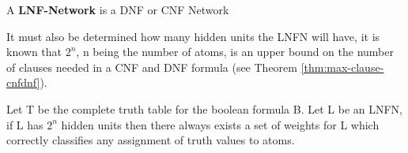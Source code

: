 \theoremstyle{definition}
\begin{definition} \label{def:lnfn}
A \textbf{LNF-Network} is a DNF or CNF Network
\end{definition}

It must also be determined how many hidden units the LNFN will have, it is known that $2^n$, n being the number of atoms, is an upper bound on the number of clauses needed in a CNF and DNF formula (see Theorem \ref{thm:max-clause-cnfdnf}).

\begin{theorem}
Let T be the complete truth table for the boolean formula B. Let L be an LNFN, if L has $2^n$ hidden units then there always exists a set of weights for L which correctly classifies any assignment of truth values to atoms.
\label{thm:upper-bound-hidden-units}
\end{theorem}

